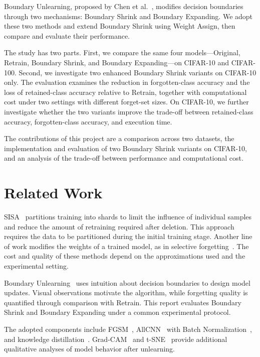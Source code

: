 \documentclass[conference]{IEEEtran}
\begin{document}
Boundary Unlearning, proposed by Chen et al.~\cite{chen2023boundary}, modifies decision boundaries through two mechanisms: Boundary Shrink and Boundary Expanding. We adopt these two methods and extend Boundary Shrink using Weight Assign, then compare and evaluate their performance.

The study has two parts. First, we compare the same four models---Original, Retrain, Boundary Shrink, and Boundary Expanding---on CIFAR-10 and CIFAR-100. Second, we investigate two enhanced Boundary Shrink variants on CIFAR-10 only. The evaluation examines the reduction in forgotten-class accuracy and the loss of retained-class accuracy relative to Retrain, together with computational cost under two settings with different forget-set sizes. On CIFAR-10, we further investigate whether the two variants improve the trade-off between retained-class accuracy, forgotten-class accuracy, and execution time.

The contributions of this project are a comparison across two datasets, the implementation and evaluation of two Boundary Shrink variants on CIFAR-10, and an analysis of the trade-off between performance and computational cost.

\section{Related Work}
SISA~\cite{bourtoule2021machine} partitions training into shards to limit the influence of individual samples and reduce the amount of retraining required after deletion. This approach requires the data to be partitioned during the initial training stage. Another line of work modifies the weights of a trained model, as in selective forgetting~\cite{golatkar2020eternal}. The cost and quality of these methods depend on the approximations used and the experimental setting.

Boundary Unlearning~\cite{chen2023boundary} uses intuition about decision boundaries to design model updates. Visual observations motivate the algorithm, while forgetting quality is quantified through comparison with Retrain. This report evaluates Boundary Shrink and Boundary Expanding under a common experimental protocol.

The adopted components include FGSM~\cite{goodfellow2015explaining}, AllCNN~\cite{springenberg2015allcnn} with Batch Normalization~\cite{ioffe2015batch}, and knowledge distillation~\cite{hinton2015distilling}. Grad-CAM~\cite{selvaraju2017gradcam} and t-SNE~\cite{maaten2008tsne} provide additional qualitative analyses of model behavior after unlearning.
\end{document}
